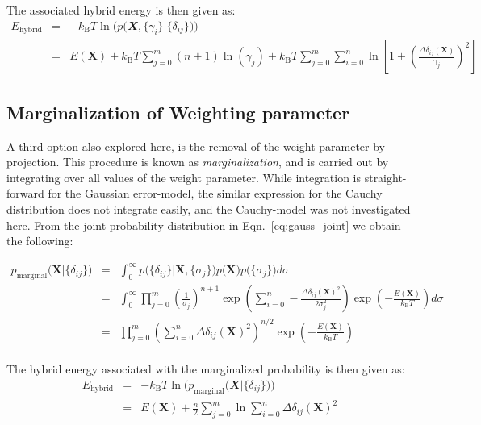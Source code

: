 The associated hybrid energy is then given as:
\begin{eqnarray}
    E_{\mathrm{hybrid}}
    & = &- k_\mathrm{B}T \ln{ \Big(p\Big( \mathbfit X, \{\gamma_i\} \Big| \{\delta_{ij}\} \Big)\Big) }\nonumber\\
    & = & E(\mathbf X) 
    + k_\mathrm{B}T \sum_{j=0}^{m}(n+1) \ln{ \left(\gamma_j \right)} 
    + k_\mathrm{B}T \sum_{j=0}^{m} \sum_{i=0}^{n} \ln{\left[ 1 + \left(\frac{\Delta\delta_{ij}(\mathbf X)}{\gamma_j} \right)^2\right]}
\end{eqnarray}


\subsection{Marginalization of Weighting parameter}

A third option also explored here, is the removal of the weight parameter by projection.
This procedure is known as \textit{marginalization}, and is carried out by integrating over all values of the weight parameter.
While integration is straight-forward for the Gaussian error-model, the similar expression for the Cauchy distribution does not integrate easily, and the Cauchy-model was not investigated here.
From the joint probability distribution in Eqn.~\ref{eq:gauss_joint} we obtain the following:

\begin{eqnarray}
    p_{\mathrm{marginal}}\Big(\mathbf X \Big| \{\delta_{ij}\} \Big) 
    & = & \int_0^\infty p\Big( \{\delta_{ij}\} \Big| \mathbf X, \{\sigma_j\}\Big)p\Big (\mathbf X \Big) p\Big ( \{\sigma_j\} \Big) d\sigma \nonumber\\
    & = & \int_0^\infty \prod_{j=0}^{m} \left( \frac{1}{\sigma_j }\right)^{n+1} \exp{ \left( \sum_{i=0}^{n} - \frac{\Delta\delta_{ij}(\mathbf X)^2}{2\sigma_j^2} \right)\exp{\left(-\frac{E(\mathbf X)}{k_\mathrm{B}T}\right)}} d\sigma\nonumber\\
    & = &  \prod_{j=0}^{m}  \left( \sum_{i=0}^{n} \Delta\delta_{ij}(\mathbf X)^2 \right)^{n/2} \exp{\left(-\frac{E(\mathbf X)}{k_\mathrm{B}T}\right)}
\end{eqnarray}\\
The hybrid energy associated with the marginalized probability is then given as:
\begin{eqnarray}
    E_{\mathrm{hybrid}}
    & = &- k_\mathrm{B}T \ln{ \Big(p_{\mathrm{marginal}}\Big( \mathbfit X \Big| \{\delta_{ij}\} \Big)\Big) }\nonumber\\
    & = & E(\mathbf X) 
    + \frac{n}{2} \sum_{j=0}^{m} \ln{\sum_{i=0}^{n} \Delta\delta_{ij}(\mathbf X)^2}
\end{eqnarray}

